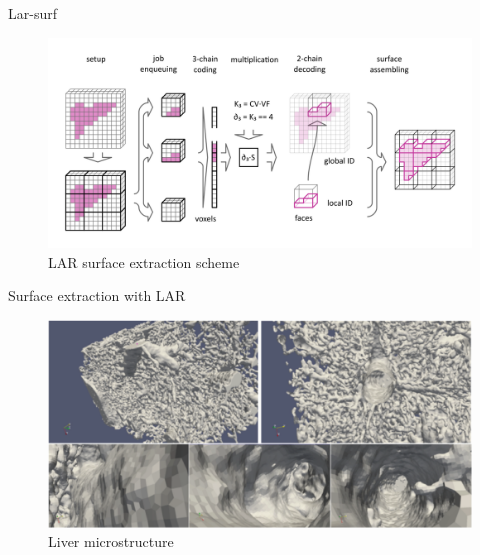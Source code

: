 \documentclass{beamer}
\begin{document}
\begin{frame}{Lar-surf}
\begin{figure}
    \centering
            \includegraphics[width=\textwidth]{figs/schema_horizontal.png}
    \caption{LAR surface extraction scheme}
\end{figure}
    
\end{frame}

\begin{frame}{Surface extraction with LAR}
\begin{figure}
    \centering
            \includegraphics[width=\textwidth]{figs/paoluzzi_dicarlo_furiani_jirik_2016.png}
    \caption{Liver microstructure\cite{Paoluzzi2016}}
\end{figure}
    
\end{frame}
\end{document}
